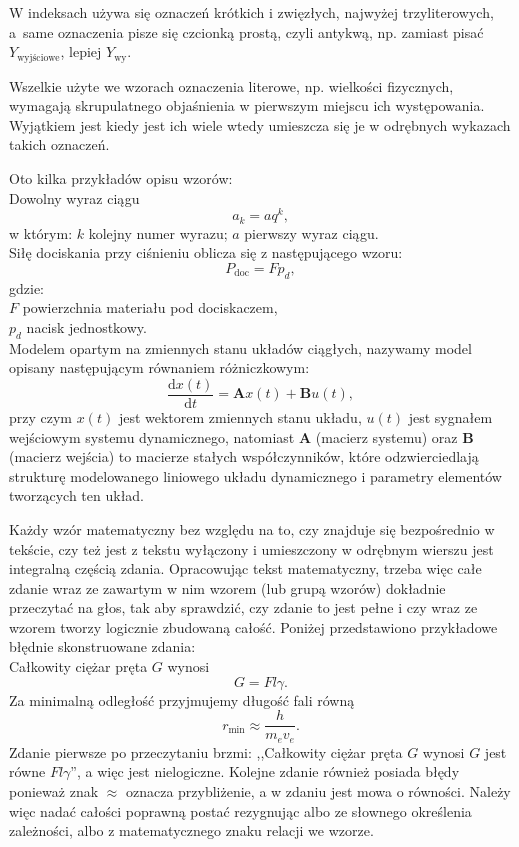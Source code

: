 W indeksach używa się oznaczeń krótkich i zwięzłych, najwyżej trzyliterowych, a~same oznaczenia pisze się czcionką prostą, czyli antykwą, np. zamiast pisać ${Y_\mathrm{wyjściowe}}$, lepiej $Y_{\mathrm{wy}}$.

Wszelkie użyte we wzorach oznaczenia literowe, np. wielkości fizycznych, wymagają skrupulatnego objaśnienia w pierwszym miejscu ich występowania. Wyjątkiem jest kiedy jest ich wiele \pauza wtedy umieszcza się je w odrębnych wykazach takich oznaczeń.

Oto kilka przykładów opisu wzorów:\\
Dowolny wyraz ciągu
\begin{equation}
a_k=aq^k,
\end{equation}
w którym: $k$ \pauza kolejny numer wyrazu; $a$ \pauza pierwszy wyraz ciągu.\\
Siłę dociskania przy ciśnieniu oblicza się z następującego wzoru:
\begin{equation}
P_{\mathrm{doc}}= Fp_d,
\end{equation}
gdzie:\\
$F$ \pauza powierzchnia materiału pod dociskaczem,\\
$p_d$ \pauza nacisk jednostkowy.\\
Modelem opartym na zmiennych stanu układów ciągłych, nazywamy model opisany następującym równaniem różniczkowym:
\begin{equation}\label{eq:rownanieStanu}
\frac{\mathrm{d}x(t)}{\mathrm{d}t}=\boldsymbol{A}x(t)+\boldsymbol{B}u(t),
\end{equation}
przy czym $x(t)$ jest wektorem zmiennych stanu układu, $u(t)$ jest sygnałem wejściowym systemu dynamicznego, natomiast $\boldsymbol{A}$ (macierz systemu) oraz $\boldsymbol{B}$ (macierz wejścia) to macierze stałych współczynników, które odzwierciedlają strukturę modelowanego liniowego układu dynamicznego i parametry elementów tworzących ten układ. 

Każdy wzór matematyczny \pauza bez względu na to, czy znajduje się bezpośrednio w tekście, czy też jest z tekstu wyłączony i umieszczony w odrębnym wierszu \pauza jest integralną częścią zdania. Opracowując tekst matematyczny, trzeba więc całe zdanie wraz ze zawartym w nim wzorem (lub grupą wzorów) dokładnie przeczytać na głos, tak aby sprawdzić, czy zdanie to jest pełne i czy wraz ze wzorem tworzy logicznie zbudowaną całość. Poniżej przedstawiono przykładowe błędnie skonstruowane zdania:\\
Całkowity ciężar pręta $G$ wynosi
\begin{equation}\label{eq:zle1}
G = Fl\gamma.
\end{equation}
Za minimalną odległość przyjmujemy długość fali równą 
\begin{equation}\label{eq:zle2}
r_{\min} \approx \frac{h}{m_e v_e}.
\end{equation}
Zdanie pierwsze po przeczytaniu brzmi: ,,Całkowity ciężar pręta $G$ wynosi $G$ jest równe $Fl\gamma$'', a więc jest nielogiczne. Kolejne zdanie również posiada błędy ponieważ znak $\approx$ oznacza przybliżenie, a w zdaniu jest mowa o równości. Należy więc nadać całości poprawną postać \pauza rezygnując albo ze słownego określenia zależności, albo z matematycznego znaku relacji we wzorze.

